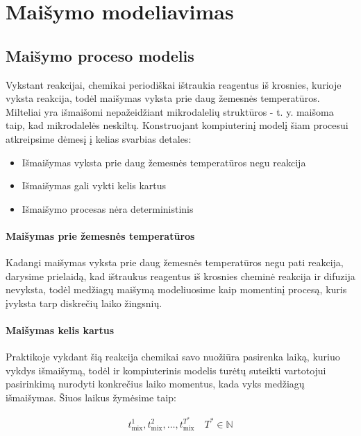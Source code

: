 
\section{Maišymo modeliavimas}
\subsection{Maišymo proceso modelis}

Vykstant reakcijai, chemikai periodiškai ištraukia reagentus iš krosnies, kurioje vyksta reakcija, todėl maišymas vyksta prie daug žemesnės temperatūros. Milteliai yra išmaišomi nepažeidžiant mikrodalelių struktūros - t. y. maišoma taip, kad mikrodalelės neskiltų. Konstruojant kompiuterinį modelį šiam procesui atkreipsime dėmesį į kelias svarbias detales:

\begin{itemize}
    \item Išmaišymas vyksta prie daug žemesnės temperatūros negu reakcija
    \item Išmaišymas gali vykti kelis kartus
    \item Išmaišymo procesas nėra deterministinis
\end{itemize}

\paragraph{Maišymas prie žemesnės temperatūros}

Kadangi maišymas vyksta prie daug žemesnės temperatūros negu pati reakcija, darysime prielaidą, kad ištraukus reagentus iš krosnies cheminė reakcija ir difuzija nevyksta, todėl medžiagų maišymą modeliuosime kaip momentinį procesą, kuris įvyksta tarp diskrečių laiko žingsnių.

\paragraph{Maišymas kelis kartus}

Praktikoje vykdant šią reakcija chemikai savo nuožiūra pasirenka laiką, kuriuo vykdys išmaišymą, todėl ir kompiuterinis modelis turėtų suteikti vartotojui pasirinkimą nurodyti konkrečius laiko momentus, kada vyks medžiagų išmaišymas. Šiuos laikus žymėsime taip:

\begin{align}
    t^1_\text{mix}, t^2_\text{mix}, \dots, t^{T^*}_\text{mix} \quad T^*\in \mathbb{N}
\end{align}

